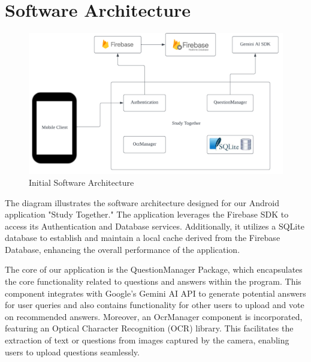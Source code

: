 \chapter{Software Architecture}\label{software_architecture}

\begin{figure}[h]
       \centering
       \includegraphics[scale = .80]{Figures/StudyTogether_Architecture.png}
       \caption{\footnotesize Initial Software Architecture}
       \label{fig2}
\end{figure}

The diagram illustrates the software architecture designed for our Android application "Study Together." The application leverages the Firebase SDK to access its Authentication and Database services. Additionally, it utilizes a SQLite database to establish and maintain a local cache derived from the Firebase Database, enhancing the overall performance of the application.

The core of our application is the QuestionManager Package, which encapsulates the core functionality related to questions and answers within the program. This component integrates with Google's Gemini AI API to generate potential answers for user queries and also contains functionality for other users to upload and vote on recommended answers. Moreover, an OcrManager component is incorporated, featuring an Optical Character Recognition (OCR) library. This facilitates the extraction of text or questions from images captured by the camera, enabling users to upload questions seamlessly.
